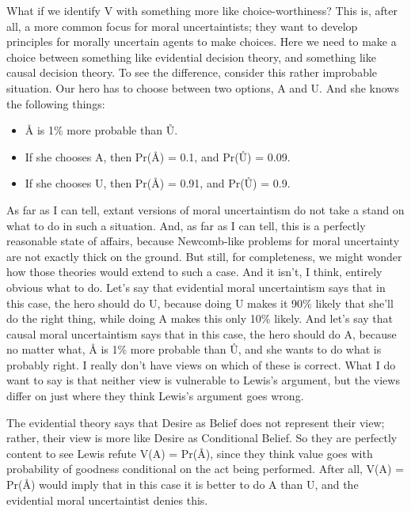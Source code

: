 What if we identify V with something more like choice-worthiness? This is, after all, a more common focus for moral uncertaintists; they want to develop principles for morally uncertain agents to make choices. Here we need to make a choice between something like evidential decision theory, and something like causal decision theory. To see the difference, consider this rather improbable situation. Our hero has to choose between two options, A and U. And she knows the following things:

\begin{itemize}
\item{} Å is 1\% more probable than Ů.

\item{} If she chooses A, then Pr(Å) = 0.1, and Pr(Ů) = 0.09.

\item{} If she chooses U, then Pr(Å) = 0.91, and Pr(Ů) = 0.9.

\end{itemize}

As far as I can tell, extant versions of moral uncertaintism do not take a stand on what to do in such a situation. And, as far as I can tell, this is a perfectly reasonable state of affairs, because Newcomb-like problems for moral uncertainty are not exactly thick on the ground. But still, for completeness, we might wonder how those theories would extend to such a case. And it isn't, I think, entirely obvious what to do. Let's say that evidential moral uncertaintism says that in this case, the hero should do U, because doing U makes it 90\% likely that she'll do the right thing, while doing A makes this only 10\% likely. And let's say that causal moral uncertaintism says that in this case, the hero should do A, because no matter what, Å is 1\% more probable than Ů, and she wants to do what is probably right. I really don't have views on which of these is correct. What I do want to say is that neither view is vulnerable to Lewis's argument, but the views differ on just where they think Lewis's argument goes wrong.

The evidential theory says that Desire as Belief does not represent their view; rather, their view is more like Desire as Conditional Belief. So they are perfectly content to see Lewis refute V(A) = Pr(Å), since they think value goes with probability of goodness conditional on the act being performed. After all, V(A) = Pr(Å) would imply that in this case it is better to do A than U, and the evidential moral uncertaintist denies this.

